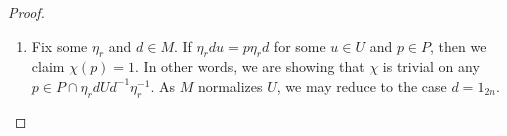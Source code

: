 \begin{proof}
\begin{enumerate}
		For the remainder of the proof, our goal will be to show that $f\in\mc H$ will have $f(\eta_rd)=0$ for any $d\in M$ whenever $r\ne n$. This will complete the proof because it shows that any $f\in\mc H$ is supported on $P\eta_nP=P\eta_nU$, meaning that $f=f(\eta_n)f_{\chi,T}$, so $\left\{f_{\chi,T}\right\}$ is a basis of $\mc H$. %

		The basic sketch is that we will find various $u\in U$ such that $\eta_rdu=p\eta_rd$ for some $p\in P$, which will allow us to show that $f(\eta_rd)=f(\eta_rdu)$, but then $f(\eta_rd)\ne0$ would imply $\psi_T(u)=1$. Having many such $u$ will allow us to force a full column of $T$ to vanish, violating the hypothesis that $T$ is invertible.


		\item Fix some $\eta_r$ and $d\in M$. If $\eta_rdu=p\eta_rd$ for some $u\in U$ and $p\in P$, then we claim $\chi(p)=1$. In other words, we are showing that $\chi$ is trivial on any $p\in P\cap\eta_rdUd^{-1}\eta_r^{-1}$. As $M$ normalizes $U$, we may reduce to the case $d=1_{2n}$.


\end{enumerate}
\end{proof}
